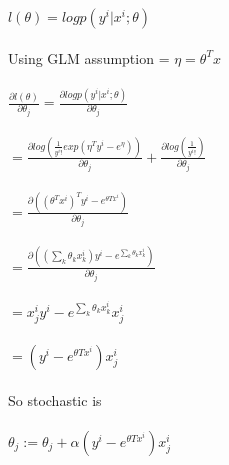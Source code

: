 \newcommand\tab[1][1cm]{\hspace*{#1}}
\begin{answer}

	\tab[2.25cm]$l(\theta)=logp(y^i | x^i ; \theta)$ \\ \\
	Using GLM assumption = $\eta = \theta^Tx$\\ \\
	\tab[2.25cm]$\frac{\partial l(\theta)}{\partial \theta_j} = \frac{\partial logp(y^i|x^i;\theta)}{\partial\theta_j}$\\ \\
	\tab[3.25cm]$ = \frac{\partial log(\frac{1}{y^i!}exp(\eta^Ty^i-e^\eta))}{\partial\theta_j}+ \frac{\partial log(\frac{1}{y^i!})}{\partial\theta_j}$\\ \\
	\tab[3.25cm]$ = \frac{\partial((\theta^Tx^i)^Ty^i-e^{\theta Tx^i})}{\partial\theta_j}$\\ \\
	\tab[3.25cm]$ = \frac{\partial((\sum_k\theta_kx^i_k)y^i-e^{\sum_k\theta_kx^i_k})}{\partial\theta_j}$\\ \\
	\tab[3.25cm]$ = x^i_jy^i-e^{\sum_k\theta_kx^i_k}x^i_j$\\ \\
	\tab[3.25cm]$ = (y^i-e^{\theta T x^i})x^i_j$\\ \\
	So stochastic is \\ \\ 
	\tab[2.25cm]$\theta_j := \theta_j + \alpha(y^i-e^{\theta T x^i})x^i_j$ \\ \\
\end{answer}
